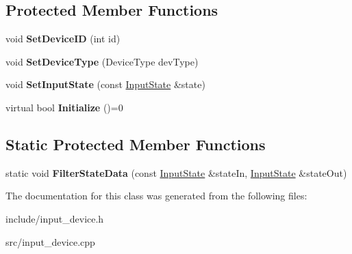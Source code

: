 \subsection*{Protected Member Functions}
\begin{DoxyCompactItemize}
\item 
\mbox{\label{class_blade_1_1_input_device_aa61d2df62fef1370b09ffb7469fc5da4}} 
void {\bfseries Set\+Device\+ID} (int id)
\item 
\mbox{\label{class_blade_1_1_input_device_ab810d1917cee9709b339db1074d10e9a}} 
void {\bfseries Set\+Device\+Type} (Device\+Type dev\+Type)
\item 
\mbox{\label{class_blade_1_1_input_device_a7e01bfa10e141d916b4459051a08b645}} 
void {\bfseries Set\+Input\+State} (const \hyperlink{struct_blade_1_1_input_state}{Input\+State} \&state)
\item 
\mbox{\label{class_blade_1_1_input_device_a701823a23160c1e4e169716647d6570b}} 
virtual bool {\bfseries Initialize} ()=0
\end{DoxyCompactItemize}
\subsection*{Static Protected Member Functions}
\begin{DoxyCompactItemize}
\item 
\mbox{\label{class_blade_1_1_input_device_ad9d8a25471322063e459f7b13f328d20}} 
static void {\bfseries Filter\+State\+Data} (const \hyperlink{struct_blade_1_1_input_state}{Input\+State} \&state\+In, \hyperlink{struct_blade_1_1_input_state}{Input\+State} \&state\+Out)
\end{DoxyCompactItemize}


The documentation for this class was generated from the following files\+:\begin{DoxyCompactItemize}
\item 
include/input\+\_\+device.\+h\item 
src/input\+\_\+device.\+cpp\end{DoxyCompactItemize}
